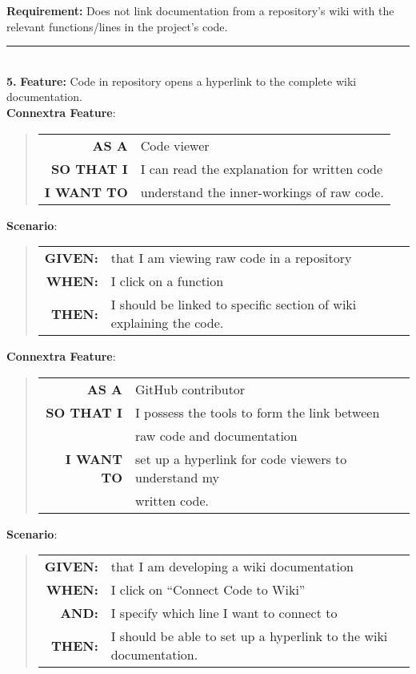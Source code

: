 \documentclass[12pt]{article}
\newcommand{\Requirement}[1] {
   \noindent \textbf{Requirement:} #1
}
\newcommand{\Feature}[1]{ 
   \noindent \textbf{Feature:} #1
}
\newcommand{\GivenSc} {
	\noindent \textbf{GIVEN:}
	}
\newcommand{\WhenSc} {
	\noindent \textbf{WHEN:}
	}
\newcommand{\AndSc} {
	\noindent \textbf{AND:}
	}
\newcommand{\ThenSc} {
	\noindent \textbf{THEN:}
	}
\begin{document}
\pagebreak
\begin{framed}
\Requirement{Does not link documentation from a repository's wiki with the relevant functions/lines in the project's code.}\\[0.2cm]

\hrule~\\

\noindent  \textbf{5.} \Feature{Code in repository opens a hyperlink to the complete wiki documentation.}\\[0.2cm]

\noindent \textbf{Connextra Feature}:
\begin{quote}
\begin{tabular}{rl}
\textbf{AS A}      & Code viewer\\
\textbf{SO THAT I} & I can read the explanation for written code\\
\textbf{I WANT TO} & understand the inner-workings of raw code.
\end{tabular}
\end{quote}


\noindent \textbf{Scenario}:
\begin{quote}
\begin{tabular}{rl}
\GivenSc & that I am viewing raw code in a repository\\
\WhenSc & I click on a function\\
\ThenSc & I should be linked to specific section of wiki explaining the code. 
\end{tabular}
\end{quote}


\noindent \textbf{Connextra Feature}:
\begin{quote}
\begin{tabular}{rl}
\textbf{AS A}      & \textsf{GitHub} contributor\\
\textbf{SO THAT I} & I possess the tools to form the link between \\
                   & raw code and documentation \\
\textbf{I WANT TO} & set up a hyperlink for code viewers to understand my\\
                   &  written code.
\end{tabular}
\end{quote}

\noindent \textbf{Scenario}:
\begin{quote}
\begin{tabular}{rl}
\GivenSc & that I am developing a wiki documentation\\
\WhenSc & I click on ``Connect Code to Wiki''\\
\AndSc & I specify which line I want to connect to\\
\ThenSc & I should be able to set up a hyperlink to the wiki documentation.
\end{tabular}
\end{quote}


\end{framed}
\end{document}
